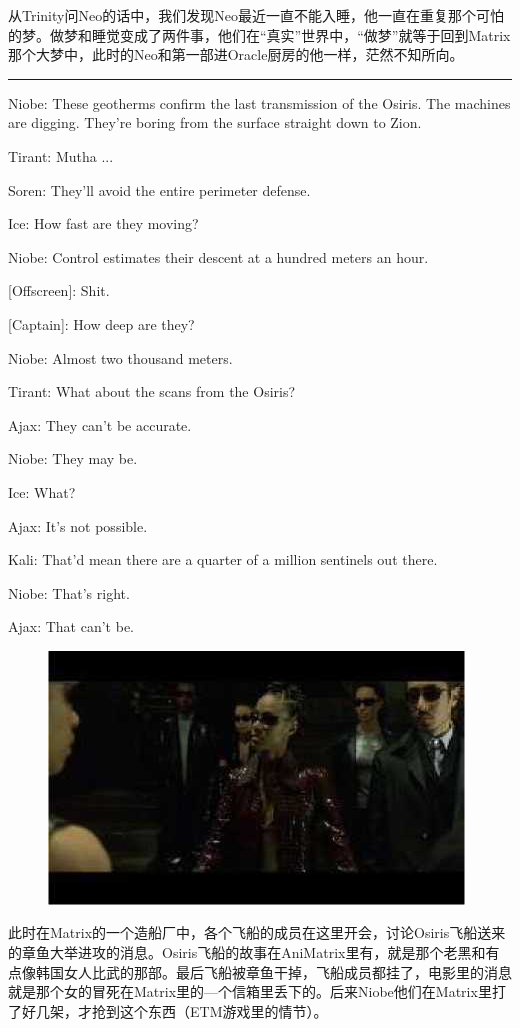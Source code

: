 \documentclass{ctexart}
\newcommand{\myparsep}{\noindent \rule[0.5ex]{\linewidth}{1pt}}
\newenvironment{myquote}{\color{green} \setlength{\leftskip}{6em} \setlength{\rightskip}{4em} \setlength{\parindent}{-2em}}{\par}
\begin{document}
从Trinity问Neo的话中，我们发现Neo最近一直不能入睡，他一直在重复那个可怕的梦。做梦和睡觉变成了两件事，他们在“真实”世界中，“做梦”就等于回到Matrix那个大梦中，此时的Neo和第一部进Oracle厨房的他一样，茫然不知所向。

\myparsep

\begin{myquote}
Niobe: These geotherms confirm the last transmission of the Osiris. The machines are digging. They're boring from the surface straight down to Zion.

Tirant: Mutha ...

Soren: They'll avoid the entire perimeter defense.

Ice: How fast are they moving?

Niobe: Control estimates their descent at a hundred meters an hour.

[Offscreen]: Shit.

[Captain]: How deep are they?

Niobe: Almost two thousand meters.

Tirant: What about the scans from the Osiris?

Ajax: They can't be accurate.

Niobe: They may be.

Ice: What?

Ajax: It's not possible.

Kali: That'd mean there are a quarter of a million sentinels out there.

Niobe: That's right.

Ajax: That can't be.
\end{myquote}

\begin{figure}[htb]
\centering
\includegraphics[width=0.5\linewidth]{fig/read_reloaded-15}
\end{figure}

此时在Matrix的一个造船厂中，各个飞船的成员在这里开会，讨论Osiris飞船送来的章鱼大举进攻的消息。Osiris飞船的故事在AniMatrix里有，就是那个老黑和有点像韩国女人比武的那部。最后飞船被章鱼干掉，飞船成员都挂了，电影里的消息就是那个女的冒死在Matrix里的—个信箱里丢下的。后来Niobe他们在Matrix里打了好几架，才抢到这个东西（ETM游戏里的情节）。
\end{document}
